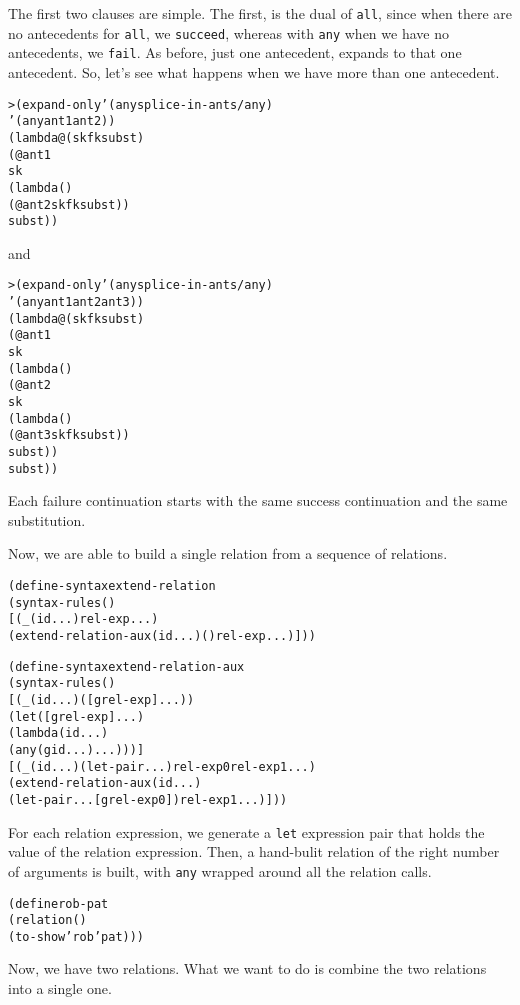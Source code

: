 The first two clauses are simple.  The first, is the dual of
\texttt{all}, since when there are no antecedents for \texttt{all},
we \texttt{succeed}, whereas with \texttt{any} when we have no
antecedents, we \texttt{fail}.  As before, just one antecedent, expands
to that one antecedent.  So, let's see what happens when we have more
than one antecedent.

\begin{alltt}
> (expand-only '(any splice-in-ants/any)
    '(any ant1 ant2))
(lambda@ (sk fk subst)
  (@ ant1
     sk
     (lambda ()
       (@ ant2 sk fk subst))
     subst))
\end{alltt}

\noindent
and

\begin{alltt}
> (expand-only '(any splice-in-ants/any)
    '(any ant1 ant2 ant3))
(lambda@ (sk fk subst)
  (@ ant1
     sk
     (lambda ()
       (@ ant2
          sk
          (lambda ()
            (@ ant3 sk fk subst))
          subst))
     subst))
\end{alltt}
\noindent
Each failure continuation starts with the same success continuation
and the same substitution.

Now, we are able to build a single relation from a sequence of relations.

\begin{alltt}
(define-syntax extend-relation
  (syntax-rules ()
    [(_ (id ...) rel-exp ...)
     (extend-relation-aux (id ...) () rel-exp ...)]))

(define-syntax extend-relation-aux
  (syntax-rules ()
    [(_ (id ...) ([g rel-exp] ...))
     (let ([g rel-exp] ...)
       (lambda (id ...)
         (any (g id ...) ...)))]
    [(_ (id ...) (let-pair ...) rel-exp0 rel-exp1 ...)
     (extend-relation-aux (id ...)
       (let-pair ... [g rel-exp0]) rel-exp1 ...)]))
\end{alltt}

For each relation expression, we generate a \texttt{let} expression
pair that holds the value of the relation expression.  Then, a
hand-bulit relation of the right number of arguments is built, with
\texttt{any} wrapped around all the relation calls.

\begin{alltt}
(define rob-pat
  (relation ()
    (to-show 'rob 'pat)))
\end{alltt}

Now, we have two relations.  What we want to do is combine the two
relations into a single one.

